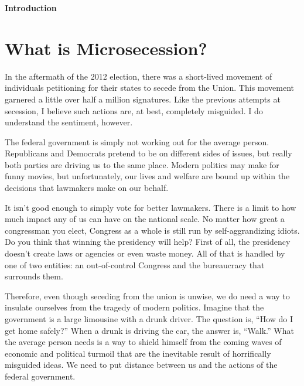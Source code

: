 \documentclass[letterpaper]{article}
\title{}
\begin{document}
\clearpage\setcounter{page}{1}\pagestyle{Standard}
{\centering{}\bfseries\color{black}
Introduction
\par}


\bigskip

\section{What is Microsecession?}

\bigskip

{\color{black}
In the aftermath of the 2012 election, there was a short-lived movement
of individuals petitioning for their states to secede from the
Union\textcolor[rgb]{0.32941177,0.5529412,0.83137256}{. This movement
garnered} a little over half a million signatures. Like the previous
attempts at secession, I believe such actions are, at best, completely
misguided. I do understand the
sentiment\textcolor[rgb]{0.32941177,0.5529412,0.83137256}{, however}. }

{\color{black}
The federal government is simply not working out for the average person.
Republicans and Democrats pretend to be on different sides of issues,
but really \textcolor[rgb]{0.32941177,0.5529412,0.83137256}{both
parties are} driving us to the same place. Modern politics
\textcolor[rgb]{0.32941177,0.5529412,0.83137256}{may make} for funny
movies, but unfortunately, our lives and welfare are bound up within
the decisions that lawmakers make on our behalf.}

{\color{black}
It isn’t good enough to simply vote for better lawmakers. There is a
limit to how much impact any of us can have on the national scale. No
matter how great a congressman you elect, Congress as a whole is still
run by self-aggrandizing idiots. Do you think that winning the
presidency will help?  First of all, the presidency doesn’t create laws
or agencies or even waste money. All of that is handled by one of two
entities: an out-of-control Congress and the bureaucracy that surrounds
them.}

{\color{black}
Therefore, even though seceding from the union is unwise, we do need a
way to insulate ourselves from the tragedy of modern politics. Imagine
that the government is a large limousine with a drunk driver. The
question is, “How do I get home safely?”  When a drunk is driving the
car, the answer is, “Walk.”  What the average person needs is a way to
shield himself from the coming waves of economic and political turmoil
that are the inevitable result of horrifically misguided ideas. We need
to put distance between us and the actions of the federal government. }
\end{document}
